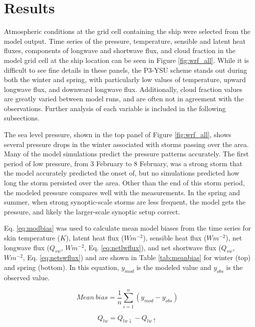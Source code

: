 \section{Results}
Atmospheric conditions at the grid cell containing the ship were selected from the model output. Time series of the pressure, temperature, sensible and latent heat fluxes, components of longwave and shortwave flux, and cloud fraction in the model grid cell at the ship location can be seen in Figure \ref{fig:wrf_all}. While it is difficult to see fine details in these panels, the P3-YSU scheme stands out during both the winter and spring, with particularly low values of temperature, upward longwave flux, and downward longwave flux. Additionally, cloud fraction values are greatly varied between model runs, and are often not in agreement with the observations. Further analysis of each variable is included in the following subsections.

The sea level pressure, shown in the top panel of Figure \ref{fig:wrf_all}, shows several pressure drops in the winter associated with storms passing over the area. Many of the model simulations predict the pressure patterns accurately. The first period of low pressure, from 3 February to 8 February, was a strong storm \citep{cohen:2017} that the model accurately predicted the onset of, but no simulations predicted how long the storm persisted over the area. Other than the end of this storm period, the modeled pressure compares well with the measurements. In the spring and summer, when strong synoptic-scale storms are less frequent, the model gets the pressure, and likely the larger-scale synoptic setup correct. 

Eq. \ref{eq:modbias} was used to calculate mean model biases from the time series for skin temperature ($K$), latent heat flux ($Wm^{-2}$), sensible heat flux ($Wm^{-2}$), net longwave flux ($Q_{sw}$, $Wm^{-2}$, Eq. \ref{eq:netlwflux}), and net shortwave flux ($Q_{sw}$, $Wm^{-2}$, Eq. \ref{eq:netswflux}) and are shown in Table \ref{tab:meanbias} for winter (top) and spring (bottom). In this equation, $y_{mod}$ is the modeled value and $y_{obs}$ is the observed value.
 
\begin{equation}\label{eq:modbias}
Mean~bias = \frac{1}{n}\sum^{n}_{i=1}(y_{mod} - y_{obs})
\end{equation}

\begin{equation}\label{eq:netlwflux}
Q_{lw} = Q_{lw \downarrow} - Q_{lw \uparrow}
\end{equation}

